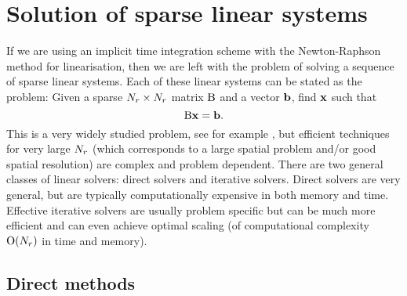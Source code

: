 




\section{Solution of sparse linear systems}
\label{sec:solution-lin-sys}

If we are using an implicit time integration scheme with the Newton-Raphson method for linearisation, then we are left with the problem of solving a sequence of sparse linear systems.
Each of these linear systems can be stated as the problem: Given a sparse $N_r \times N_r$ matrix $\mathrm{B}$ and a vector ${\boldsymbol{\mathrm{b}}}$, find $\boldsymbol{\mathrm{x}}$ such that
\begin{equation}
  \label{eq:linear-system}
  \mathrm{B} \boldsymbol{\mathrm{x}} = {\boldsymbol{\mathrm{b}}}.
\end{equation}
This is a very widely studied problem, see for example \cite{Saad2000}, but efficient techniques for very large $N_r$ (which corresponds to a large spatial problem and/or good spatial resolution) are complex and problem dependent.
There are two general classes of linear solvers: direct solvers and iterative solvers.
Direct solvers are very general, but are typically computationally expensive in both memory and time.
Effective iterative solvers are usually problem specific but can be much more efficient and can even achieve optimal scaling (\ie of computational complexity $\mathrm{O}{\left( N_r \right)}$ in time and memory).


\subsection{Direct methods}
\label{sec:direct-methods}

